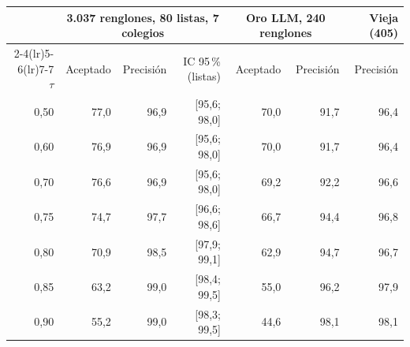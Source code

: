 \begin{tabular}{@{}rrrrrrr@{}}
\toprule
& \multicolumn{3}{c}{3.037 renglones, 80 listas, 7 colegios} & \multicolumn{2}{c}{Oro LLM, 240 renglones} & Vieja (405) \\
\cmidrule(lr){2-4}\cmidrule(lr){5-6}\cmidrule(lr){7-7}
$\tau$ & Aceptado & Precisi\'on & IC 95\,\% (listas) & Aceptado & Precisi\'on & Precisi\'on \\
\midrule
0,50 & 77,0 & 96,9 & [95,6; 98,0] & 70,0 & 91,7 & 96,4 \\
0,60 & 76,9 & 96,9 & [95,6; 98,0] & 70,0 & 91,7 & 96,4 \\
0,70 & 76,6 & 96,9 & [95,6; 98,0] & 69,2 & 92,2 & 96,6 \\
0,75 & 74,7 & 97,7 & [96,6; 98,6] & 66,7 & 94,4 & 96,8 \\
0,80 & 70,9 & 98,5 & [97,9; 99,1] & 62,9 & 94,7 & 96,7 \\
0,85 & 63,2 & 99,0 & [98,4; 99,5] & 55,0 & 96,2 & 97,9 \\
0,90 & 55,2 & 99,0 & [98,3; 99,5] & 44,6 & 98,1 & 98,1 \\
\bottomrule
\end{tabular}
